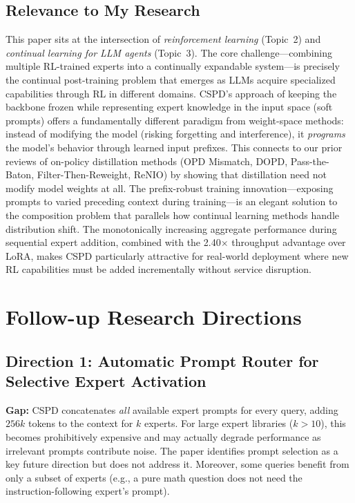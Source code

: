 \documentclass[11pt,a4paper]{article}
\begin{document}
\subsection{Relevance to My Research}
This paper sits at the intersection of \emph{reinforcement learning} (Topic~2) and \emph{continual learning for LLM agents} (Topic~3). The core challenge---combining multiple RL-trained experts into a continually expandable system---is precisely the continual post-training problem that emerges as LLMs acquire specialized capabilities through RL in different domains. CSPD's approach of keeping the backbone frozen while representing expert knowledge in the input space (soft prompts) offers a fundamentally different paradigm from weight-space methods: instead of modifying the model (risking forgetting and interference), it \emph{programs} the model's behavior through learned input prefixes. This connects to our prior reviews of on-policy distillation methods (OPD Mismatch, DOPD, Pass-the-Baton, Filter-Then-Reweight, ReNIO) by showing that distillation need not modify model weights at all. The prefix-robust training innovation---exposing prompts to varied preceding context during training---is an elegant solution to the composition problem that parallels how continual learning methods handle distribution shift. The monotonically increasing aggregate performance during sequential expert addition, combined with the 2.40$\times$ throughput advantage over LoRA, makes CSPD particularly attractive for real-world deployment where new RL capabilities must be added incrementally without service disruption.

\section{Follow-up Research Directions}

\subsection{Direction 1: Automatic Prompt Router for Selective Expert Activation}
\textbf{Gap:} CSPD concatenates \emph{all} available expert prompts for every query, adding $256k$ tokens to the context for $k$ experts. For large expert libraries ($k > 10$), this becomes prohibitively expensive and may actually degrade performance as irrelevant prompts contribute noise. The paper identifies prompt selection as a key future direction but does not address it. Moreover, some queries benefit from only a subset of experts (e.g., a pure math question does not need the instruction-following expert's prompt).
\end{document}
